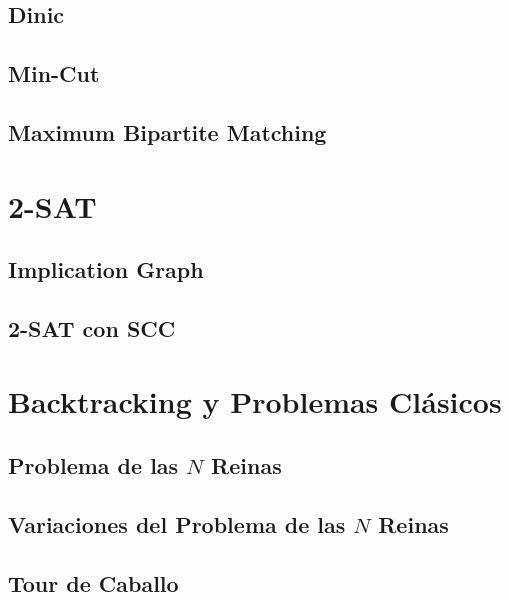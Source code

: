 \documentclass[10pt,a4paper,twocolumn]{article}
\begin{document}
\subsection{Dinic}

\subsection{Min-Cut}

\subsection{Maximum Bipartite Matching}



\section{2-SAT}

\subsection{Implication Graph}

\subsection{2-SAT con SCC}



\section{Backtracking y Problemas Clásicos}

\subsection{Problema de las $N$ Reinas}

\subsection{Variaciones del Problema de las $N$ Reinas}

\subsection{Tour de Caballo}
\end{document}
